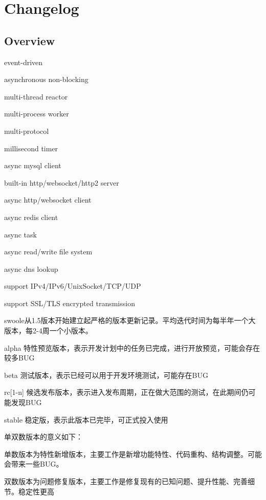 \part{Changelog}


\chapter{Overview}


\begin{compactitem}
\item event-driven
\item asynchronous non-blocking
\item multi-thread reactor
\item multi-process worker
\item multi-protocol
\item millisecond timer
\item async mysql client
\item built-in http/websocket/http2 server
\item async http/websocket client
\item async redis client
\item async task
\item async read/write file system
\item async dns lookup
\item support IPv4/IPv6/UnixSocket/TCP/UDP
\item support SSL/TLS encrypted transmission
\end{compactitem}

swoole从1.5版本开始建立起严格的版本更新记录。平均迭代时间为每半年一个大版本，每2-4周一个小版本。

\begin{compactitem}
\item alpha 特性预览版本，表示开发计划中的任务已完成，进行开放预览，可能会存在较多BUG
\item beta 测试版本，表示已经可以用于开发环境测试，可能存在BUG
\item rc[1-n] 候选发布版本，表示进入发布周期，正在做大范围的测试，在此期间仍可能发现BUG
\item stable 稳定版，表示此版本已完毕，可正式投入使用
\end{compactitem}

单双数版本的意义如下：

\begin{compactitem}
\item 单数版本为特性新增版本，主要工作是新增功能特性、代码重构、结构调整。可能会带来一些BUG。
\item 双数版本为问题修复版本，主要工作是修复现有的已知问题、提升性能、完善细节。稳定性更高
\end{compactitem}



